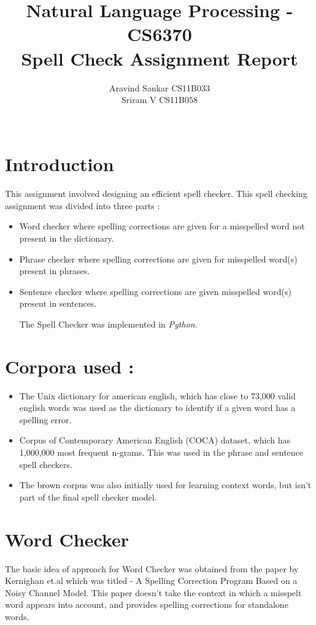 \documentclass{article}
\begin{document}
\title{\textbf{Natural Language Processing - CS6370 }
\\
\textbf{Spell Check Assignment Report}}
\author{Aravind Sankar CS11B033 \\
Sriram V CS11B058 \\
\\[0.2in]
}

\maketitle
\section{Introduction}
This assignment involved designing an efficient spell checker. This spell checking assignment was divided into three parts : 
\begin{itemize}
\item Word checker where spelling corrections are given for a misspelled word not present in the dictionary.
\item Phrase checker where spelling corrections are given for misspelled word(s) present in phrases.
\item Sentence checker where spelling corrections are given misspelled word(s) present in sentences.

The Spell Checker was implemented in \textit{Python}.
\end{itemize}

\section{Corpora used :}
\begin{itemize}

\item The Unix dictionary for american english, which has close to 73,000 valid english words was used as the dictionary to identify if a given word has a spelling error.

\item Corpus of Contemporary American English (COCA) dataset, which has 1,000,000 most frequent n-grams. This was used in the phrase and sentence spell checkers.	

\item The brown corpus was also initially used for learning context words, but isn't part of the final spell checker model.

\end{itemize}

\section{Word Checker}
The basic idea of approach for Word Checker was obtained from the paper by Kernighan et.al which was titled - A Spelling Correction Program Based on a Noisy Channel Model. This paper doesn't take the context in which a misspelt word appears into account, and provides spelling corrections for standalone words.
\end{document}
